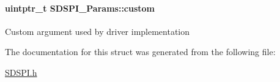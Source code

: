 \paragraph[{custom}]{\setlength{\rightskip}{0pt plus 5cm}uintptr\+\_\+t S\+D\+S\+P\+I\+\_\+\+Params\+::custom}\label{struct_s_d_s_p_i___params_a6872317d366047e5d0b8eab22ca0a828}
Custom argument used by driver implementation 

The documentation for this struct was generated from the following file\+:\begin{DoxyCompactItemize}
\item 
\hyperlink{_s_d_s_p_i_8h}{S\+D\+S\+P\+I.\+h}\end{DoxyCompactItemize}
